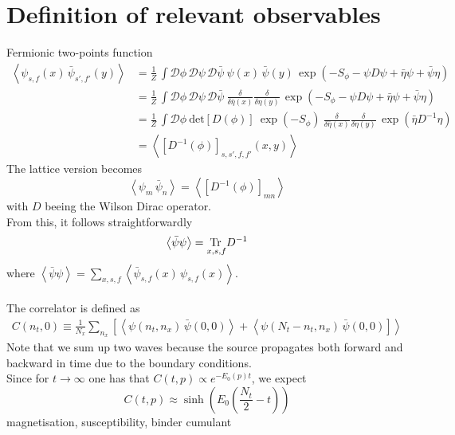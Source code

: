 \section{Definition of relevant observables}
Fermionic two-points function
\begin{equation} 
\begin{aligned}
    \left\langle \psi_{s,f}(x) \, \bar\psi_{s',f'}(y) \right\rangle 
    &= \frac{1}{Z} \, \int \mathcal{D}\phi \, \mathcal{D}\psi \, \mathcal{D}\bar\psi \ \psi(x) \, \bar\psi(y) \, \exp \left( - S_\phi - \psi D \psi + \bar\eta \psi + \bar \psi \eta \right) \\
    &= \frac{1}{Z} \, \int \mathcal{D}\phi \, \mathcal{D}\psi \, \mathcal{D}\bar\psi \ \frac{\delta}{\delta \bar \eta(x)} \frac{\delta}{\delta \eta(y)} \, \exp \left( - S_\phi - \psi D \psi + \bar\eta \psi + \bar \psi \eta \right) \\
    &= \frac{1}{Z} \, \int \mathcal{D}\phi \ \text{det}\left[D(\phi)\right] \ \exp \left( - S_\phi \right) \ \frac{\delta}{\delta \bar \eta(x)} \frac{\delta}{\delta \eta(y)} \, \exp\left( \bar\eta D^{-1} \eta \right) \\
    &= \left\langle \left[D^{-1}(\phi)\right]_{s,s',f,f'}(x,y)\right\rangle
\end{aligned}
\label{eq:D_inv_condensate}
\end{equation}
The lattice version becomes
\begin{equation*}
     \left\langle \psi_m \, \bar\psi_n \right\rangle =     \left\langle \left[D^{-1}(\phi)\right]_{mn}\right\rangle
\end{equation*}
with $D$ beeing the Wilson Dirac operator. \\
From this, it follows straightforwardly
\begin{equation*}
    \left\langle  \bar\psi \psi \right\rangle = \underset{x,s,f}{\operatorname{\text{Tr} \,}} D^{-1}
\end{equation*}
where $\left\langle  \bar\psi \psi \right\rangle = \underset{x,s,f}\sum  \left\langle \bar\psi_{s,f}(x) \, \psi_{s,f}(x) \right\rangle$. \\~\\
The correlator is defined as
\begin{align*}
    C(n_t,0) \equiv \frac{1}{N_x} \sum_{n_x} \left[\left\langle \psi(n_t, n_x) \, \bar\psi(0,0)\right\rangle + \left\langle \psi(N_t-n_t, n_x) \, \bar\psi(0,0) \right] \right\rangle
\end{align*}
Note that we sum up two waves because the source propagates both forward and backward in time due to the boundary conditions. \\
Since for $t \to \infty$ one has that $C(t,p) \propto e^{-E_0(p) t}$, we expect 
\begin{equation*}
    C(t,p) \approx \sinh \left(E_0 \left(\frac{N_t}{2} - t\right)\right)
\end{equation*}
magnetisation, susceptibility, binder cumulant